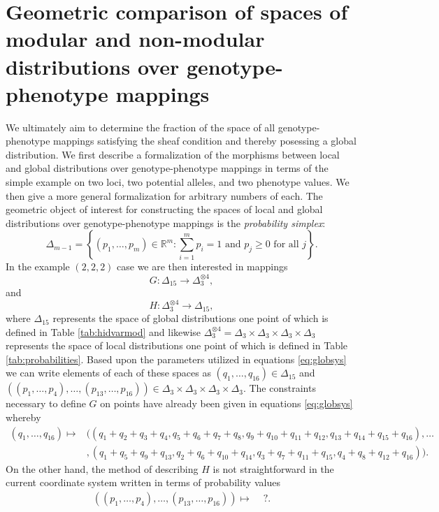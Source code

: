 \section*{Geometric comparison of spaces of modular and non-modular distributions over genotype-phenotype mappings}
We ultimately aim to determine the fraction of the space of all genotype-phenotype mappings satisfying the sheaf condition and thereby posessing a global distribution. We first describe a formalization of the morphisms between local and global distributions over genotype-phenotype mappings in terms of the simple example on two loci, two potential alleles, and two phenotype values. We then give a more general formalization for arbitrary numbers of each. The geometric object of interest for constructing the spaces of local and global distributions over genotype-phenotype mappings is the \emph{probability simplex}:
$$
\Delta_{m-1} = \left\{ (p_1, \ldots , p_m) \in \mathbb{R}^m \colon \sum_{i=1}^m p_i = 1 \text{ and } p_j \geq 0 \text{ for all } j \right\}.
$$
In the example $(2,2,2)$ case we are then interested in mappings
$$
G \colon \Delta_{15} \longrightarrow \Delta_3^{\otimes 4},
$$
and
$$
H \colon	 \Delta_3^{\otimes 4} \longrightarrow \Delta_{15},
$$
where $\Delta_{15}$ represents the space of global distributions one point of which is defined in Table \ref{tab:hidvarmod} and likewise $\Delta_3^{\otimes 4} = \Delta_3 \times \Delta_3 \times \Delta_3 \times \Delta_3$ represents the space of local distributions one point of which is defined in Table \ref{tab:probabilities}. Based upon the parameters utilized in equations \ref{eq:globsys} we can write elements of each of these spaces as $(q_1, \ldots, q_{16}) \in \Delta_{15}$ and $((p_1, \ldots , p_4), \ldots, (p_{13},\ldots,p_{16})) \in \Delta_3 \times \Delta_3 \times \Delta_3 \times \Delta_3$. The constraints necessary to define $G$ on points have already been given in equations \ref{eq:globsys} whereby
\begin{align*}
(q_1, \ldots , q_{16}) \mapsto &((q_1+q_2+q_3+q_4, q_5+q_6+q_7+q_8, q_9+q_{10}+q_{11}+q_{12},q_{13}+q_{14}+q_{15}+q_{16}), \ldots \\
&,(q_1 + q_5 + q_9 + q_{13}, q_2 + q_6 + q_{10} + q_{14}, q_3 + q_7 + q_{11} + q_{15}, q_4 + q_8 + q_{12} + q_{16} ) ).
\end{align*}
On the other hand, the method of describing $H$ is not straightforward in the current coordinate system written in terms of probability values
\begin{align*}
((p_1, \ldots , p_4), \ldots, (p_{13},\ldots,p_{16})) \mapsto & \,\,?.
\end{align*}

